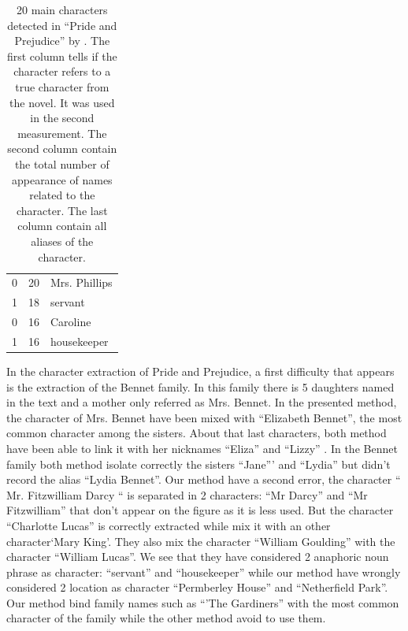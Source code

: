 \documentclass[a4paper, 12pt]{report}
\begin{document}
\begin{table}[]
{\begin{tabular}{|l|l|l|}
0             & 20       & Mrs. Phillips                                                                            \\
1             & 18       & servant                                                                                 \\
0             & 16       & Caroline                                                                                  \\
1             & 16       & housekeeper                                                                    \\
\hline
\end{tabular}}
\caption{20 main characters detected in ``Pride and Prejudice'' by \cite{character_meta}. The first column tells if the character refers to a true character from the novel. It was used in the second measurement. The second column contain the total number of appearance of names related to the character. The last column contain all aliases of the character. }

\end{table}

In the character extraction of Pride and Prejudice, a first difficulty that appears is the extraction of the Bennet family. In this family there is 5 daughters named in the text and a mother only referred as Mrs. Bennet. In the presented method, the character of Mrs. Bennet have been mixed with ``Elizabeth Bennet'', the most common character among the sisters. About that last characters, both method have been able to link it with her nicknames ``Eliza'' and ``Lizzy'' . In the Bennet family both method isolate correctly the sisters ``Jane''' and ``Lydia'' but \cite{character_meta} didn't record the alias ``Lydia Bennet''. Our method have a second error, the character `` Mr. Fitzwilliam Darcy `` is separated in 2 characters: ``Mr Darcy'' and ``Mr Fitzwilliam'' that don't appear on the figure as it is less used. But the character ``Charlotte Lucas'' is correctly extracted while \cite{character_meta} mix it with an other character`Mary King'. They also mix the character ``William Goulding'' with the character ``William Lucas''. We see that they have considered 2 anaphoric noun phrase as character: ``servant'' and ``housekeeper'' while our method have wrongly considered 2 location as character ``Permberley House'' and ``Netherfield Park''. Our method bind family names such as ``'The Gardiners'' with the most common character of the family while the other method avoid to use them.\\
\end{document}

